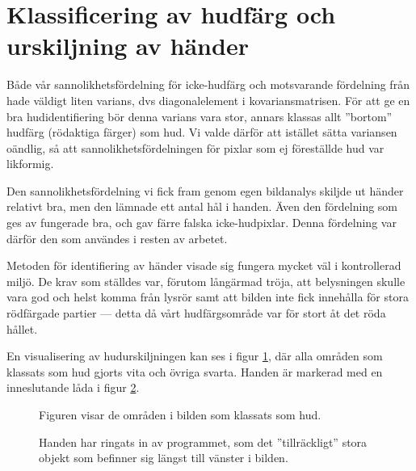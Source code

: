 \documentclass[../rapport_MVEX01-11-05]{subfiles}
\begin{document}
\section{Klassificering av hudfärg och urskiljning av händer}
Både vår sannolikhetsfördelning för icke-hudfärg och motsvarande
fördelning från  hade väldigt liten varians,
dvs diagonalelement i kovariansmatrisen. För att ge en bra
hudidentifiering bör denna varians vara stor, annars klassas allt
''bortom'' hudfärg (rödaktiga färger) som hud. Vi valde därför att
istället sätta variansen oändlig, så att sannolikhetsfördelningen för
pixlar som ej föreställde hud var likformig.

Den sannolikhetsfördelning vi fick fram genom egen bildanalys skiljde
ut händer relativt bra, men den lämnade ett antal hål i handen. Även
den fördelning som ges av  fungerade bra, och
gav färre falska icke-hudpixlar. Denna fördelning var därför den som
användes i resten av arbetet. 

Metoden för identifiering av händer visade sig fungera mycket väl i
kontrollerad miljö. De krav som ställdes var, förutom långärmad
tröja, att belysningen skulle vara god och helst komma från lysrör
samt att bilden inte fick innehålla för stora rödfärgade partier --- detta
då vårt hudfärgsområde var för stort åt det röda hållet. 

En visualisering av hudurskiljningen kan ses i figur
\ref{fig:hudklassificering}, där alla områden som klassats som hud
gjorts vita och övriga svarta. Handen är markerad med en inneslutande
låda i figur \ref{fig:boundingbox}.

\begin{figure}
	  \centering
		\caption{Figuren visar de områden i bilden som
                  klassats som hud.}
									\label{fig:hudklassificering}
\end{figure}

\begin{figure}
	  \centering
		\caption{Handen har ringats in av programmet, som det
                  ''tillräckligt'' stora objekt som befinner sig
                  längst till vänster i bilden.}
									\label{fig:boundingbox}
\end{figure}
\end{document}
